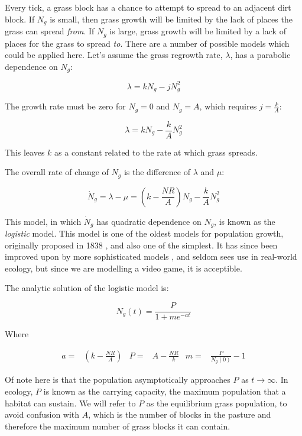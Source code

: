 \documentclass{article}
\theoremstyle{theorem}
\theoremstyle{definition}
\begin{document}
Every tick, a grass block has a chance to attempt to spread to an adjacent dirt block. If $N_g$ is small, then grass growth will be limited by the lack of places the grass can spread \textit{from}. If $N_g$ is large, grass growth will be limited by a lack of places for the grass to spread \textit{to}. There are a number of possible models which could be applied here. Let's assume the grass regrowth rate, $\lambda$, has a parabolic dependence on $N_g$:

\begin{equation*}
    \label{}
    \lambda=kN_g-jN_g^2
\end{equation*}

The growth rate must be zero for $N_g=0$ and $N_g=A$, which requires $j=\frac{k}{A}$:

\begin{equation}
    \label{growth_rate}
    \lambda=kN_g-\frac{k}{A}N_g^2
\end{equation}

This leaves $k$ as a constant related to the rate at which grass spreads.

The overall rate of change of $N_g$ is the difference of $\lambda$ and $\mu$:

\begin{equation}
    \label{logistic}
    \dot{N}_g=\lambda-\mu=\left(k-\frac{NR}{A}\right)N_g-\frac{k}{A}N_g^2
\end{equation}

This model, in which $\dot{N}_g$ has quadratic dependence on $N_g$, is known as the \textit{logistic} model. This model is one of the oldest models for population growth, originally proposed in 1838 \cite{verhulst}, and also one of the simplest. It has since been improved upon by more sophisticated models \cite{banks}, and seldom sees use in real-world ecology, but since we are modelling a video game, it is acceptible.

The analytic solution of the logistic model \cite{banks} is:

\begin{equation}
    N_g(t)=\frac{P}{1+me^{-at}}
\end{equation}

Where

\begin{align*}
    a=&\left(k-\frac{NR}{A}\right) & P=&A-\frac{NR}{k} & m=&\frac{P}{N_g(0)}-1
\end{align*}

Of note here is that the population asymptotically approaches $P$ as $t\rightarrow\infty$. In ecology, $P$ is known as the carrying capacity, the maximum population that a habitat can sustain. We will refer to $P$ as the equilibrium grass population, to avoid confusion with $A$, which is the number of blocks in the pasture and therefore the maximum number of grass blocks it can contain.
\end{document}
